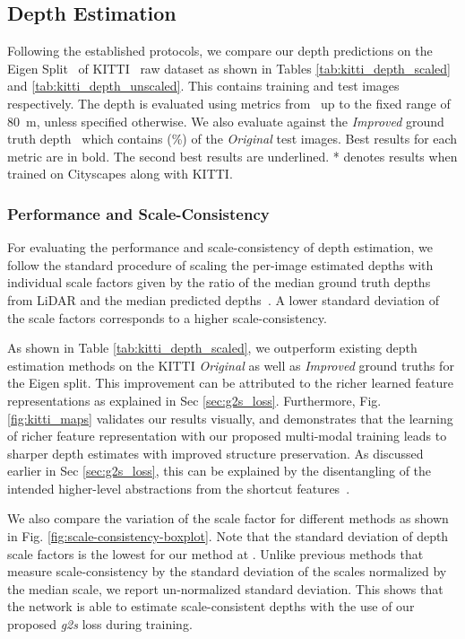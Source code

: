 \subsection{Depth Estimation}
Following the established protocols, we compare our depth predictions on the Eigen Split~\cite{eigen2014depth} of KITTI~\cite{geiger2013vision} raw dataset as shown in Tables \ref{tab:kitti_depth_scaled} and \ref{tab:kitti_depth_unscaled}. This contains  training
and  test images respectively. The depth is evaluated using metrics from~\cite{eigen2014depth} up to the fixed range of \SI{80}{m}, unless specified otherwise. 
We also evaluate against the \textit{Improved} ground truth depth~\cite{Uhrig2017THREEDV} which contains  (\%) of the  \textit{Original} test images. 
Best results for each metric are in bold. The second best results are underlined. * denotes results when trained on Cityscapes along with KITTI. 






\subsubsection{Performance and Scale-Consistency}
\label{sec:expt-scale-consistency}
For evaluating the performance and scale-consistency of depth estimation, we follow the standard procedure of scaling the per-image estimated depths  with individual scale factors given by the ratio of the median ground truth depths from LiDAR and the median predicted depths~\cite{zhou2017unsupervised}. A lower standard deviation of the scale factors corresponds to a higher scale-consistency. 


As shown in Table \ref{tab:kitti_depth_scaled}, we outperform existing depth estimation methods on the KITTI \textit{Original} as well as \textit{Improved} ground truths for the Eigen split. This improvement can be attributed to the richer learned feature representations as explained in  Sec \ref{sec:g2s_loss}.
Furthermore, Fig. \ref{fig:kitti_maps} validates our results visually, and demonstrates that the learning of richer feature representation with our proposed multi-modal training leads to sharper depth estimates with improved structure preservation. As discussed earlier in Sec \ref{sec:g2s_loss}, this can be explained by the disentangling of the intended higher-level abstractions from the shortcut features~\cite{ramachandram2017deep,jo2017measuring,geirhos2020shortcut}. 

We also compare the variation of the scale factor 
for different methods as shown in Fig. \ref{fig:scale-consistency-boxplot}. Note that the standard deviation of depth scale factors is the lowest for our method at . Unlike previous methods that measure scale-consistency by the standard deviation of the scales normalized by the median scale, we report un-normalized standard deviation.  This shows that the network is able to estimate scale-consistent depths with the use of our proposed \textit{g2s} loss during training.


